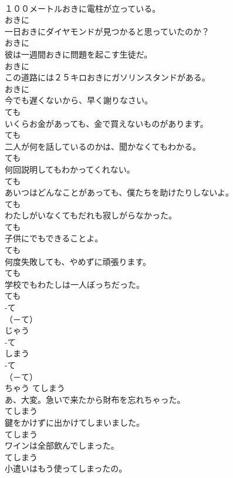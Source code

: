 \documentclass[8pt]{extreport}
\begin{document}
\begin{CJK}{UTF8}{min}
\\	１００メートルおきに電柱が立っている。	
\\	おきに	
\\	一日おきにダイヤモンドが見つかると思っていたのか？	
\\	おきに	
\\	彼は一週間おきに問題を起こす生徒だ。	
\\	おきに	
\\	この道路には２５キロおきにガソリンスタンドがある。	
\\	おきに	
\\	今でも遅くないから、早く謝りなさい。	
\\	ても	
\\	いくらお金があっても、金で買えないものがあります。	
\\	ても	
\\	二人が何を話しているのかは、聞かなくてもわかる。	
\\	ても	
\\	何回説明してもわかってくれない。	
\\	ても	
\\	あいつはどんなことがあっても、僕たちを助けたりしないよ。	
\\	ても	
\\	わたしがいなくてもだれも寂しがらなかった。	
\\	ても	
\\	子供にでもできることよ。	
\\	ても	
\\	何度失敗しても、やめずに頑張ります。	
\\	ても	
\\	学校でもわたしは一人ぼっちだった。	
\\	ても	
\\	-て
\\	（－て） 
\\	じゃう	
\\	-て
\\	しまう	
\\	-て
\\	（－て） 
\\	ちゃう	てしまう	
\\	あ、大変。急いで来たから財布を忘れちゃった。	
\\	てしまう	
\\	鍵をかけずに出かけてしまいました。	
\\	てしまう	
\\	ワインは全部飲んでしまった。	
\\	てしまう	
\\	小遣いはもう使ってしまったの。	

\end{CJK}
\end{document}
